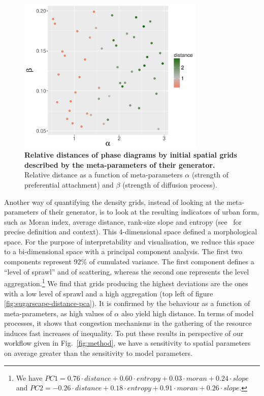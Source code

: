 \documentclass[preprint,5p,times,twocolumn,authoryear]{elsarticle}
\begin{document}
\begin{figure}
\centering
\includegraphics[width=0.8\textwidth]{figures/relativedistance_metaparams}
\caption{\textbf{Relative distances of phase diagrams by initial spatial grids described by the meta-parameters of their generator.} Relative distance as a function of meta-parameters $\alpha$ (strength of preferential attachment) and $\beta$ (strength of diffusion process).}
\label{fig:sugarscape-distance-meta}
\end{figure}

Another way of quantifying the density grids, instead of looking at the meta-parameters of their generator, is to look at the resulting indicators of urban form, such as Moran index, average distance, rank-size slope and entropy (see~\cite{LeNechet2015} for precise definition and context). This 4-dimensional space defined a morphological space. For the purpose of interpretability and visualisation, we reduce this space to a bi-dimensional space with a principal component analysis. The first two components represent 92\% of cumulated variance. The first component defines a ``level of sprawl'' and of scattering, whereas the second one represents the level aggregation.\footnote{We have $PC1 = 0.76\cdot distance + 0.60\cdot entropy + 0.03\cdot moran + 0.24\cdot slope$ and $PC2 = -0.26\cdot distance + 0.18\cdot entropy + 0.91\cdot moran + 0.26\cdot slope$.} We find that grids producing the highest deviations are the ones with a low level of sprawl and a high aggregation (top left of figure \ref{fig:sugarscape-distance-pca}). It is confirmed by the behaviour as a function of meta-parameters, as high values of $\alpha$ also yield high distance. In terms of model processes, it shows that congestion mechanisms in the gathering of the resource induces fast increases of inequality. To put these results in perspective of our workflow given in Fig.~\ref{fig:method}, we have a sensitivity to spatial parameters on average greater than the sensitivity to model parameters.
\end{document}
